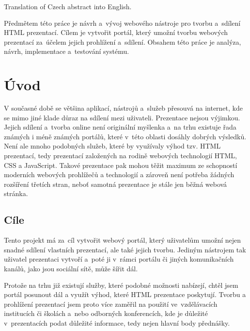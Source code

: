 \documentclass[11pt,twoside,a4paper]{book}
\begin{document}
	Translation of Czech abstract into English.


	\baselineskip

	\noindent
	Předmětem této práce je návrh a~vývoj webového nástroje pro tvorbu a~sdílení HTML prezentací. Cílem je vytvořit portál, který umožní tvorbu webových prezentací za~účelem jejich prohlížení a~sdílení. Obsahem této práce je analýza, návrh, imple\-mentace a~testování systému.

	\tableofcontents		%

	\listoffigures			%

	\mainbodystarts



\chapter{Úvod}
V současné době se většina aplikací, nástrojů a~služeb přesouvá na internet, kde se mimo jiné klade důraz na sdílení mezi uživateli. Prezentace nejsou výjimkou. Jejich sdílení a~tvorba online není originální myšlenka a~na trhu existuje řada známých i méně známých portálů, které v~této oblasti dosáhly dobrých výsledků. Není ale mnoho podobných služeb, které by využívaly výhod tzv. HTML prezentací, tedy prezentací založených na rodině webových technologií HTML, CSS a JavaScript. Takové prezentace pak mohou těžit maximum ze schopností moderních webových prohlížečů a technologií a zároveň není potřeba žádných rozšíření třetích stran, neboť samotná prezentace je stále jen běžná webová stránka.

\section{Cíle}
Tento projekt má za~cíl vytvořit webový portál, který uživatelům umožní nejen snadné sdílení vlastních prezentací, ale také jejich tvorbu. Jediným nástrojem tak uživatel prezentaci vytvoří a~poté ji v~rámci portálu či jiných komunikačních kanálů, jako jsou sociální sítě, může šířit dál.

Protože na trhu již existují služby, které podobné možnosti nabízejí, chtěl jsem portál posunout dál a využít výhod, které HTML prezentace poskytují. Tvorbu a prohlížení prezentací jsem proto více zaměřil na použití ve~vzdělávacích institucích či školách a~nebo odborných konferencích, kde je důležité v~prezentacích podat důležité informace, tedy nejen hlavní body přednášky.
\end{document}

